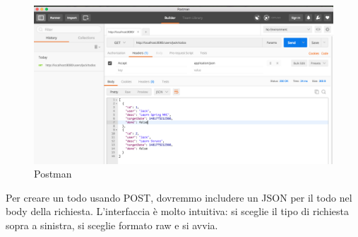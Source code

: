 \documentclass[11pt,a4paper]{book}
\begin{document}
\begin{figure}[h!]
	\begin{center}
		\includegraphics[scale=0.4]{img/002.png}
		\caption{Postman}
		\label{fig: 002}
	\end{center}
\end{figure}

Per creare un todo usando POST, dovremmo includere un JSON per il todo nel body della richiesta. L'interfaccia è molto intuitiva: si sceglie il tipo di richiesta sopra a sinistra, si sceglie formato raw e si avvia.
\end{document}
